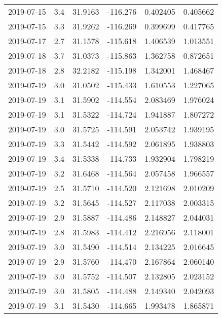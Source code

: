 \begin{tabular}{lrrrrr}
2019-07-15 &       3.4 &  31.9163 &  -116.276 &         0.402405 &         0.405662 \\
2019-07-15 &       3.3 &  31.9262 &  -116.269 &         0.399699 &         0.417765 \\
2019-07-17 &       2.7 &  31.1578 &  -115.618 &         1.406539 &         1.013551 \\
2019-07-18 &       3.7 &  31.0373 &  -115.863 &         1.362758 &         0.872651 \\
2019-07-18 &       2.8 &  32.2182 &  -115.198 &         1.342001 &         1.468467 \\
2019-07-19 &       3.0 &  31.0502 &  -115.433 &         1.610553 &         1.227065 \\
2019-07-19 &       3.1 &  31.5902 &  -114.554 &         2.083469 &         1.976024 \\
2019-07-19 &       3.1 &  31.5322 &  -114.724 &         1.941887 &         1.807272 \\
2019-07-19 &       3.0 &  31.5725 &  -114.591 &         2.053742 &         1.939195 \\
2019-07-19 &       3.3 &  31.5442 &  -114.592 &         2.061895 &         1.938803 \\
2019-07-19 &       3.4 &  31.5338 &  -114.733 &         1.932904 &         1.798219 \\
2019-07-19 &       3.2 &  31.6468 &  -114.564 &         2.057458 &         1.966557 \\
2019-07-19 &       2.5 &  31.5710 &  -114.520 &         2.121698 &         2.010209 \\
2019-07-19 &       3.2 &  31.5645 &  -114.527 &         2.117038 &         2.003315 \\
2019-07-19 &       2.9 &  31.5887 &  -114.486 &         2.148827 &         2.044031 \\
2019-07-19 &       2.8 &  31.5983 &  -114.412 &         2.216956 &         2.118001 \\
2019-07-19 &       3.0 &  31.5490 &  -114.514 &         2.134225 &         2.016645 \\
2019-07-19 &       2.9 &  31.5760 &  -114.470 &         2.167864 &         2.060140 \\
2019-07-19 &       3.0 &  31.5752 &  -114.507 &         2.132805 &         2.023152 \\
2019-07-19 &       3.0 &  31.5805 &  -114.488 &         2.149340 &         2.042093 \\
2019-07-19 &       3.1 &  31.5430 &  -114.665 &         1.993478 &         1.865871 \\

\end{tabular}
